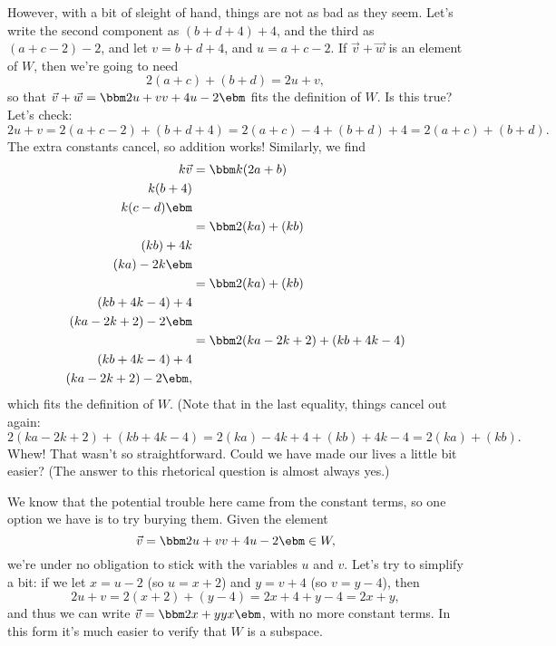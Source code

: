 {\begin{enumerate}
However, with a bit of sleight of hand, things are not as bad as they seem. Let's write the second component as $(b+d+4)+4$, and the third as $(a+c-2)-2$, and let $v=b+d+4$, and $u=a+c-2$. If $\vec v + \vec w$ is an element of $W$, then we're going to need
\[
2(a+c)+(b+d) = 2u+v,
\]
so that $\vec v + \vec w = \bbm 2u+v\\v+4\\u-2\ebm$ fits the definition of $W$. Is this true? Let's check:
\[
2u+v = 2(a+c-2)+(b+d+4) = 2(a+c)-4+(b+d)+4 = 2(a+c)+(b+d).
\]
The extra constants cancel, so addition works! Similarly, we find
\begin{align*}
k\vec v &= \bbm k(2a+b)\\k(b+4)\\k(c-d)\ebm \\
 & = \bbm 2(ka)+(kb)\\(kb)+4k\\(ka)-2k\ebm\\
 & = \bbm 2(ka)+(kb)\\(kb+4k-4)+4\\(ka-2k+2)-2\ebm\\
 & = \bbm 2(ka-2k+2)+(kb+4k-4)\\(kb+4k-4)+4\\(ka-2k+2)-2\ebm,
\end{align*}
which fits the definition of $W$. (Note that in the last equality, things cancel out again:
\[
2(ka-2k+2)+(kb+4k-4) = 2(ka)-4k+4+(kb)+4k-4 = 2(ka)+(kb).
\]
Whew! That wasn't so straightforward. Could we have made our lives a little bit easier? (The answer to this rhetorical question is almost always yes.)

We know that the potential trouble here came from the constant terms, so one option we have is to try burying them. Given the element 
\[
\vec v = \bbm 2u+v\\v+4\\u-2\ebm \in W,
\]
we're under no obligation to stick with the variables $u$ and $v$. Let's try to simplify a bit: if we let $x = u-2$ (so $u=x+2$) and $y = v+4$ (so $v=y-4$), then
\[
2u+v = 2(x+2)+(y-4) = 2x+4+y-4 = 2x+y,
\]
and thus we can write $\vec v = \bbm 2x+y\\y\\x\ebm$, with no more constant terms. In this form it's much easier to verify that $W$ is a subspace.
\end{enumerate}}

\medskip

